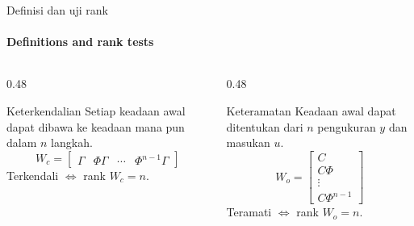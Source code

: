 \documentclass[aspectratio=169,10pt]{beamer}
\begin{document}
\begin{frame}{Definisi dan uji rank}
	\framesubtitle{Definitions and rank tests}
	\begin{columns}[T]
		\begin{column}{0.48\textwidth}
			\begin{block}{Keterkendalian}
				\small
				Setiap keadaan awal dapat dibawa ke keadaan mana pun dalam $n$ langkah.
				\[
					W_c = \begin{bmatrix}\Gamma & \Phi\Gamma & \cdots & \Phi^{n-1}\Gamma\end{bmatrix}
				\]
				Terkendali $\iff$ rank $W_c = n$.
			\end{block}
		\end{column}
		\begin{column}{0.48\textwidth}
			\begin{block}{Keteramatan}
				\small
				Keadaan awal dapat ditentukan dari $n$ pengukuran $y$ dan masukan $u$.
				\[
					W_o = \begin{bmatrix} C\\ C\Phi\\ \vdots\\ C\Phi^{n-1}\end{bmatrix}
				\]
				Teramati $\iff$ rank $W_o = n$.
			\end{block}
		\end{column}
	\end{columns}
	\vspace{0.2cm}
\end{frame}
\end{document}
